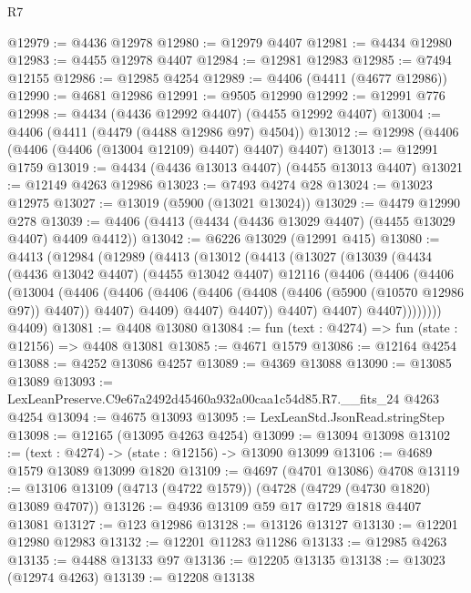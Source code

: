 \begin{lexlean}{R7}
\begin{coremodule}
@12979 := @4436 @12978
@12980 := @12979 @4407
@12981 := @4434 @12980
@12983 := @4455 @12978 @4407
@12984 := @12981 @12983
@12985 := @7494 @12155
@12986 := @12985 @4254
@12989 := @4406 (@4411 (@4677 @12986))
@12990 := @4681 @12986
@12991 := @9505 @12990
@12992 := @12991 @776
@12998 := @4434 (@4436 @12992 @4407) (@4455 @12992 @4407)
@13004 := @4406 (@4411 (@4479 (@4488 @12986 @97) @4504))
@13012 := @12998 (@4406 (@4406 (@4406 (@13004 @12109) @4407) @4407) @4407)
@13013 := @12991 @1759
@13019 := @4434 (@4436 @13013 @4407) (@4455 @13013 @4407)
@13021 := @12149 @4263 @12986
@13023 := @7493 @4274 @28
@13024 := @13023 @12975
@13027 := @13019 (@5900 (@13021 @13024))
@13029 := @4479 @12990 @278
@13039 := @4406 (@4413 (@4434 (@4436 @13029 @4407) (@4455 @13029 @4407) @4409 @4412))
@13042 := @6226 @13029 (@12991 @415)
@13080 := @4413
    (@12984
      (@12989
        (@4413
          (@13012
            (@4413
              (@13027
                (@13039
                  (@4434
                    (@4436 @13042 @4407)
                    (@4455 @13042 @4407)
                    @12116
                    (@4406
                      (@4406
                        (@4406
                          (@13004
                            (@4406
                              (@4406
                                (@4406
                                  (@4406 (@4408 (@4406 (@5900 (@10570 @12986 @97)) @4407)) @4407)
                                  @4409)
                                @4407)
                              @4407))
                          @4407)
                        @4407)
                      @4407))))))))
      @4409)
@13081 := @4408 @13080
@13084 := fun (text : @4274) => fun (state : @12156) => @4408 @13081
@13085 := @4671 @1579
@13086 := @12164 @4254
@13088 := @4252 @13086 @4257
@13089 := @4369 @13088
@13090 := @13085 @13089
@13093 := LexLeanPreserve.C9e67a2492d45460a932a00caa1c54d85.R7.__fits_24 @4263 @4254
@13094 := @4675 @13093
@13095 := LexLeanStd.JsonRead.stringStep
@13098 := @12165 (@13095 @4263 @4254)
@13099 := @13094 @13098
@13102 := (text : @4274) -> (state : @12156) -> @13090 @13099
@13106 := @4689 @1579 @13089 @13099 @1820
@13109 := @4697 (@4701 @13086) @4708
@13119 := @13106 @13109 (@4713 (@4722 @1579)) (@4728 (@4729 (@4730 @1820) @13089 @4707))
@13126 := @4936 @13109 @59 @17 @1729 @1818 @4407 @13081
@13127 := @123 @12986
@13128 := @13126 @13127
@13130 := @12201 @12980 @12983
@13132 := @12201 @11283 @11286
@13133 := @12985 @4263
@13135 := @4488 @13133 @97
@13136 := @12205 @13135
@13138 := @13023 (@12974 @4263)
@13139 := @12208 @13138

\end{coremodule}
\end{lexlean}
